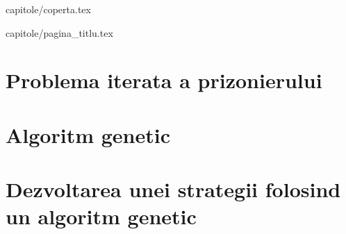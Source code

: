 \documentclass[12pt,oneside]{report}
\begin{document}
 {capitole/coperta.tex}

 {capitole/pagina_titlu.tex}





\tableofcontents

\setcounter{section}{0}
\chapter*{Problema iterata a prizonierului}


\setcounter{section}{0}
\chapter*{Algoritm genetic}


\setcounter{section}{0}
\chapter*{Dezvoltarea unei strategii folosind un algoritm genetic}



	
\end{document}
